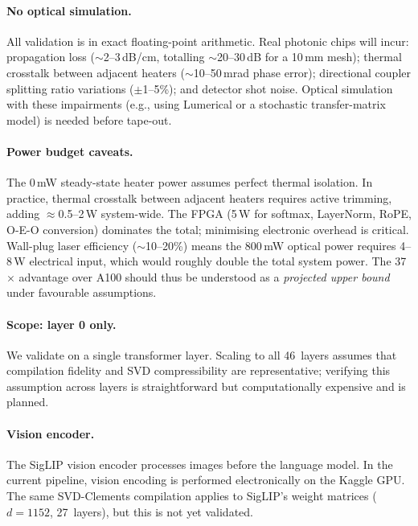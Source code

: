 \documentclass[journal]{IEEEtran}
\begin{document}
\paragraph{No optical simulation.}
All validation is in exact floating-point arithmetic.
Real photonic chips will incur:
propagation loss ($\sim$2--3\,dB/cm, totalling $\sim$20--30\,dB for a
10\,mm mesh);
thermal crosstalk between adjacent heaters ($\sim$10--50\,mrad phase error);
directional coupler splitting ratio variations ($\pm$1--5\%);
and detector shot noise.
Optical simulation with these impairments (e.g., using Lumerical or a
stochastic transfer-matrix model) is needed before tape-out.

\paragraph{Power budget caveats.}
The 0\,mW steady-state heater power assumes perfect thermal isolation.
In practice, thermal crosstalk between adjacent heaters requires active
trimming, adding $\approx$0.5--2\,W system-wide.
The FPGA (5\,W for softmax, LayerNorm, RoPE, O-E-O conversion) dominates
the total; minimising electronic overhead is critical.
Wall-plug laser efficiency ($\sim$10--20\%) means the 800\,mW optical power
requires 4--8\,W electrical input, which would roughly double the total
system power.
The 37$\times$ advantage over A100 should thus be understood as a
\emph{projected upper bound} under favourable assumptions.

\paragraph{Scope: layer 0 only.}
We validate on a single transformer layer.
Scaling to all 46~layers assumes that compilation fidelity and SVD
compressibility are representative; verifying this assumption across layers
is straightforward but computationally expensive and is planned.

\paragraph{Vision encoder.}
The SigLIP vision encoder processes images before the language model.
In the current pipeline, vision encoding is performed electronically on the
Kaggle GPU.
The same SVD-Clements compilation applies to SigLIP's weight matrices
($d=1152$, 27~layers), but this is not yet validated.

\end{document}
